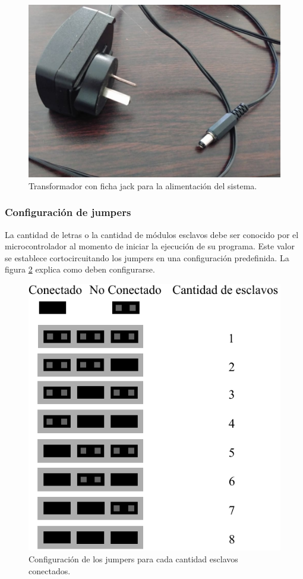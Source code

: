 \begin{figure}[!ht]
	\centering
	\includegraphics[width=0.8\linewidth]{imagenes/guia/trafo.jpeg}
	\caption{Transformador con ficha jack para la alimentación del sistema.}
	\label{fig:guia-trafo}
\end{figure}

\subsubsection{Configuración de jumpers}\label{sec:config-jumpers}

La cantidad de letras o la cantidad de módulos esclavos debe ser conocido por el microcontrolador al momento de iniciar la ejecución de su programa. Este valor se establece cortocircuitando los jumpers en una configuración predefinida. La figura \ref{fig:manual-jumpers} explica como deben configurarse.

\begin{figure}[ht!]
	\centering
	\includegraphics[width=0.6\linewidth]{imagenes/jumper.pdf}
	\caption{Configuración de los jumpers para cada cantidad esclavos conectados.}
	\label{fig:manual-jumpers}
\end{figure}